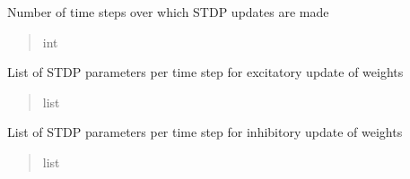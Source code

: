 \documentclass[letterpaper,10pt,english]{sphinxmanual}
\begin{document}
\begin{fulllineitems}
\begin{fulllineitems}
\begin{quote}
\begin{description}
\end{description}\end{quote}

\end{fulllineitems}


\begin{fulllineitems}
\label{\detokenize{index:superneuromat.SNN.stdp_time_steps}}
\pysigstartsignatures
\pysigline
{}
\pysigstopsignatures
\sphinxAtStartPar
Number of time steps over which STDP updates are made
\begin{quote}\begin{description}
\sphinxAtStartPar
int

\end{description}\end{quote}

\end{fulllineitems}


\begin{fulllineitems}
\label{\detokenize{index:superneuromat.SNN.stdp_Apos}}
\pysigstartsignatures
\pysigline
{}
\pysigstopsignatures
\sphinxAtStartPar
List of STDP parameters per time step for excitatory update of weights
\begin{quote}\begin{description}
\sphinxAtStartPar
list

\end{description}\end{quote}

\end{fulllineitems}


\begin{fulllineitems}
\label{\detokenize{index:superneuromat.SNN.stdp_Aneg}}
\pysigstartsignatures
\pysigline
{}
\pysigstopsignatures
\sphinxAtStartPar
List of STDP parameters per time step for inhibitory update of weights
\begin{quote}\begin{description}
\sphinxAtStartPar
list


\end{description}
\end{quote}
\end{fulllineitems}
\end{fulllineitems}
\end{document}
